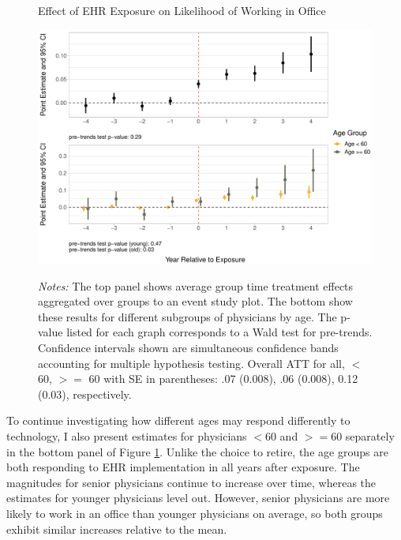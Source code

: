 \documentclass[12pt]{article}
\begin{document}
\begin{figure}[ht]
    \centering
    \captionsetup{width=.85\linewidth}
    \caption{Effect of EHR Exposure on Likelihood of Working in Office}
    \includegraphics[scale=.6]{Objects/officeind_plot.pdf}
    \label{fig:officefirst}
    \vspace{2mm}
    \caption*{\footnotesize{\textit{Notes:} The top panel shows average group time treatment effects aggregated over groups to an event study plot. The bottom show these results for different subgroups of physicians by age. The p-value listed for each graph corresponds to a Wald test for pre-trends. Confidence intervals shown are simultaneous confidence bands accounting for multiple hypothesis testing. Overall ATT for all, $<$ 60, $>=$ 60 with SE in parentheses: .07 (0.008), .06 (0.008), 0.12 (0.03), respectively.}}
\end{figure}

To continue investigating how different ages may respond differently to technology, I also present estimates for physicians $<60$ and $>=60$ separately in the bottom panel of Figure \ref{fig:officefirst}. Unlike the choice to retire, the age groups are both responding to EHR implementation in all years after exposure. The magnitudes for senior physicians continue to increase over time, whereas the estimates for younger physicians level out. However, senior physicians are more likely to work in an office than younger physicians on average, so both groups exhibit similar increases relative to the mean. 
\end{document}
